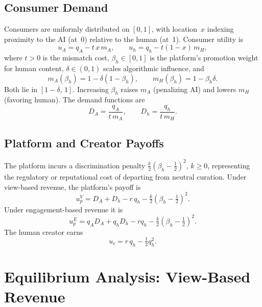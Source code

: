 \documentclass[mnsc,nonblindrev]{informs3_NoOR}
\begin{document}
\subsection{Consumer Demand}
 
Consumers are uniformly distributed on $[0,1]$, with location~$x$ indexing proximity to the AI (at~0) relative to the human (at~1). Consumer utility is
\begin{equation}\label{eq:utility}
u_A = q_A - t\,x\,m_A, \qquad u_h = q_h - t(1-x)\,m_H,
\end{equation}
where $t > 0$ is the mismatch cost, $\beta_h \in [0,1]$ is the platform's promotion weight for human content, $\delta \in (0,1)$ scales algorithmic influence, and
\begin{equation}\label{eq:mismatch}
m_A(\beta_h) = 1 - \delta(1-\beta_h), \qquad m_H(\beta_h) = 1 - \beta_h\delta.
\end{equation}
Both lie in $[1-\delta,\,1]$. Increasing $\beta_h$ raises $m_A$ (penalizing AI) and lowers $m_H$ (favoring human). The demand functions are
\begin{equation}\label{eq:demand}
D_A = \frac{q_A}{t\,m_A}, \qquad D_h = \frac{q_h }{t\,m_H}.
\end{equation}
 
\subsection{Platform and Creator Payoffs}
 
The platform incurs a discrimination penalty $\tfrac{k}{2}(\beta_h - \tfrac{1}{2})^2$, $k \geq 0$, representing the regulatory or reputational cost of departing from neutral curation. Under view-based revenue, the platform's payoff is
\begin{equation}\label{eq:up-view}
u_p^V = D_A + D_h -r\,q_h - \tfrac{k}{2}(\beta_h - \tfrac{1}{2})^2.
\end{equation}
Under engagement-based revenue it is
\begin{equation}\label{eq:up-eng}
u_p^E = q_A D_A + q_h D_h - r q_h - \tfrac{k}{2}(\beta_h - \tfrac{1}{2})^2.
\end{equation}
The human creator earns
\begin{equation}\label{eq:uc}
u_c = r\,q_h - \tfrac{1}{2}q_h^2.
\end{equation}

\section{Equilibrium Analysis: View-Based Revenue}\label{sec:view}
 
\end{document}
